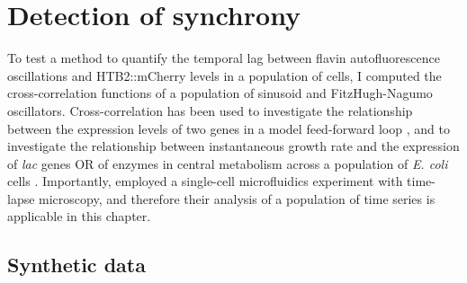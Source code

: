 \section{Detection of synchrony}
\label{sec:analysis-correlation}

To test a method to quantify the temporal lag between flavin autofluorescence oscillations and HTB2::mCherry levels in a population of cells, I computed the cross-correlation functions of a population of sinusoid and FitzHugh-Nagumo oscillators.
Cross-correlation has been used to investigate the relationship between the expression levels of two genes in a model feed-forward loop \parencite{dunlopRegulatoryActivityRevealed2008},
and to investigate the relationship between instantaneous growth rate and the expression of \textit{lac} genes OR of enzymes in central metabolism across a population of \textit{E. coli} cells \parencite{kivietStochasticityMetabolismGrowth2014}.
Importantly, \textcite{kivietStochasticityMetabolismGrowth2014} employed a single-cell microfluidics experiment with time-lapse microscopy, and therefore their analysis of a population of time series is applicable in this chapter.

\subsection{Synthetic data}
\label{subsubsec:analysis-correlation-synthetic}


